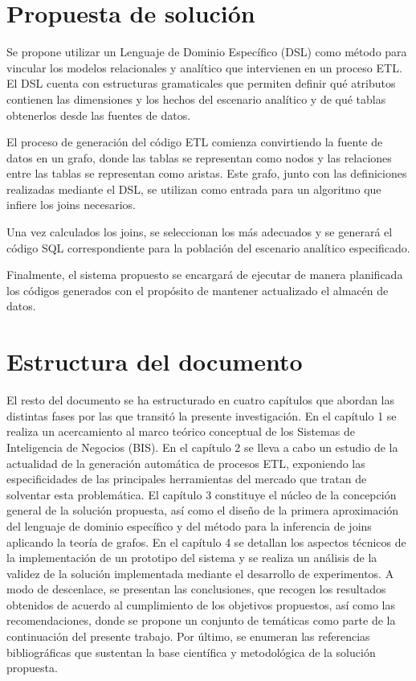 \section{Propuesta de soluci\'on}

Se propone utilizar un Lenguaje de Dominio Específico (DSL) como método para vincular los modelos relacionales y analítico
que intervienen en un proceso ETL. El DSL cuenta con estructuras gramaticales que permiten definir qu\'e atributos 
contienen las dimensiones y los hechos del escenario analítico y de qu\'e tablas obtenerlos desde las fuentes de datos.

El proceso de generación del c\'odigo ETL comienza convirtiendo la fuente de datos en un grafo, donde las tablas 
se representan como nodos y las relaciones entre las tablas se representan como aristas. Este grafo, junto con las 
definiciones realizadas mediante el DSL, se utilizan como entrada para un algoritmo que infiere los joins necesarios.

Una vez calculados los joins, se seleccionan los más adecuados y se generará el 
código SQL correspondiente para la población del escenario analítico especificado.

Finalmente, el sistema propuesto se encargará de ejecutar de manera planificada los códigos generados con el propósito de 
mantener actualizado el almacén de datos. 

\section{Estructura del documento}

El resto del documento se ha estructurado en cuatro capítulos que abordan las distintas fases por las que transitó la 
presente investigación. En el cap\'itulo 1 se realiza un acercamiento al marco te\'orico conceptual de los Sistemas de 
Inteligencia de Negocios (BIS). En el cap\'itulo 2 se lleva a cabo un estudio de la actualidad de la generaci\'on autom\'atica 
de procesos ETL, exponiendo las especificidades de las principales herramientas del mercado que tratan de solventar esta 
problem\'atica. El cap\'itulo 3 constituye el núcleo de la concepción general de la solución propuesta, así como el 
diseño de la primera aproximación del lenguaje de dominio específico y del método para la inferencia de joins 
aplicando la teoría de grafos. En el capítulo 4 se 
detallan los aspectos técnicos de la implementación de un prototipo del sistema y se realiza un análisis de la validez de 
la solución implementada mediante el desarrollo de experimentos. A modo de descenlace, se presentan las conclusiones,
que recogen los resultados obtenidos de acuerdo al cumplimiento de los objetivos propuestos, así como las recomendaciones, 
donde se propone un conjunto de temáticas como parte de la continuación del presente trabajo. Por último, se enumeran
las referencias bibliográficas que sustentan la base científica y metodológica de la solución propuesta.